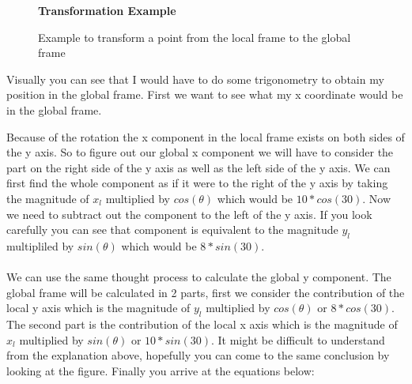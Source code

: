 \documentclass[12pt,letterpaper,boxed]{hmcpset}
\begin{document}
\begin{figure}[H]
	\centering
	\textbf{Transformation Example}\par\medskip
	\caption{Example to transform a point from the local frame to the global frame}
	\label{fig:example1}
\end{figure}

Visually you can see that I would have to do some trigonometry to obtain my position in the global frame. First we want to see what my x coordinate would be in the global frame.

Because of the rotation the x component in the local frame exists on both sides of the y axis. So to figure out our global x component we will have to consider the part on the right side of the y axis as well as the left side of the y axis. We can first find the whole component as if it were to the right of the y axis by taking the magnitude of $x_{l}$ multiplied by $cos(\theta)$ which would be $10*cos(30)$. Now we need to subtract out the component to the left of the y axis. If you look carefully you can see that component is equivalent to the magnitude $y_{l}$ multipliled by $sin(\theta)$ which would be $8*sin(30)$.\\\\
We can use the same thought process to calculate the global y component. The global frame will be calculated in 2 parts, first we consider the contribution of the local y axis which is the magnitude of $y_{l}$ multiplied by $cos(\theta)$ or $8*cos(30)$. The second part is the contribution of the local x axis which is the magnitude of $x_{l}$ multiplied by $sin(\theta)$ or $10*sin(30)$. It might be difficult to understand from the explanation above, hopefully you can come to the same conclusion by looking at the figure. Finally you arrive at the equations below:\\
\end{document}
